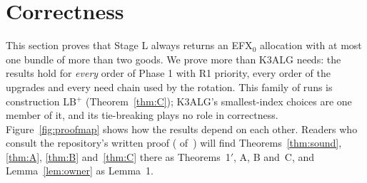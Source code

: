 \documentclass[runningheads,11pt]{llncs}
\newcommand{\efxz}{\texorpdfstring{\mbox{EFX$_0$}}{EFX0}}
\newcommand{\LBp}{\texorpdfstring{\mbox{LB$^{+}$}}{LB+}}
\begin{document}
\section{Correctness}\label{sec:correct}

This section proves that Stage L always returns an \efxz{} allocation with at most one bundle of more than two goods. We prove more than K3ALG needs: the results hold for \emph{every} order of Phase 1 with R1 priority, every order of the upgrades and every need chain used by the rotation. This family of runs is construction \LBp{} (Theorem~\ref{thm:C}); K3ALG's smallest-index choices are one member of it, and its tie-breaking plays no role in correctness. Figure~\ref{fig:proofmap} shows how the results depend on each other. Readers who consult the repository's written proof ( of~\cite{Repo}) will find Theorems~\ref{thm:sound}, \ref{thm:A}, \ref{thm:B} and~\ref{thm:C} there as Theorems~1$'$, A, B and~C, and Lemma~\ref{lem:owner} as Lemma~1.
\end{document}
